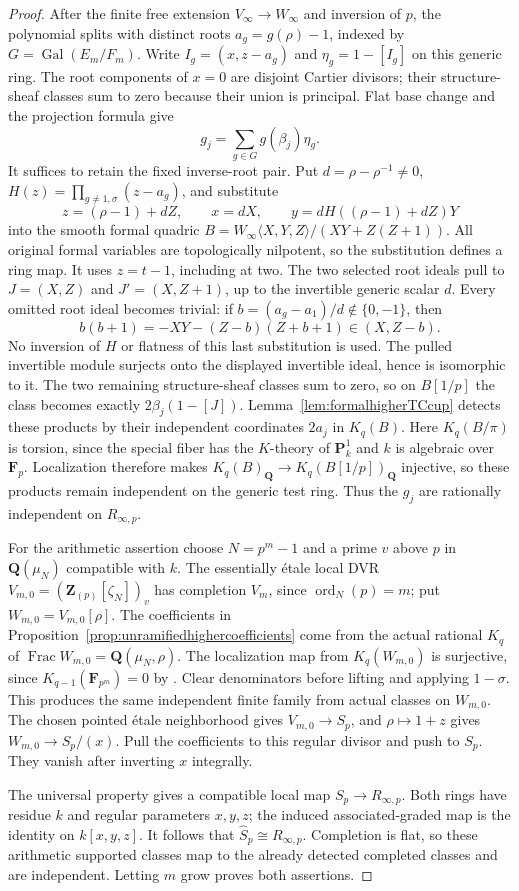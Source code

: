 \documentclass[11pt,a4paper]{article}
\theoremstyle{remark}
\newcommand{\Q}{\mathbf Q}
\newcommand{\Z}{\mathbf Z}
\newcommand{\F}{\mathbf F}
\newcommand{\Frac}{\operatorname{Frac}}
\begin{document}
\begin{proof}
After the finite free extension $V_\infty\to W_\infty$ and
inversion of $p$, the polynomial splits with distinct roots
$a_g=g(\rho)-1$, indexed by
$G=\operatorname{Gal}(E_m/F_m)$.
Write $I_g=(x,z-a_g)$ and $\eta_g=1-[I_g]$ on this generic ring.
The root components of $x=0$ are disjoint Cartier divisors;
their structure-sheaf classes sum to zero because their union is
principal. Flat base change and the projection formula give
\[
 g_j=\sum_{g\in G}g(\beta_j)\eta_g.
\]
It suffices to retain the fixed inverse-root pair.
Put $d=\rho-\rho^{-1}\ne0$,
$H(z)=\prod_{g\ne1,\sigma}(z-a_g)$, and substitute
\[
 z=(\rho-1)+dZ,\qquad x=dX,\qquad
 y=dH((\rho-1)+dZ)Y
\]
into the smooth formal quadric
$B=W_\infty\langle X,Y,Z\rangle/(XY+Z(Z+1))$.
All original formal variables are topologically nilpotent, so the
substitution defines a ring map. It uses $z=t-1$, including at two.
The two selected root ideals pull to $J=(X,Z)$ and $J'=(X,Z+1)$,
up to the invertible generic scalar $d$.
Every omitted root ideal becomes trivial: if
$b=(a_g-a_1)/d\notin\{0,-1\}$, then
\[
 b(b+1)=-XY-(Z-b)(Z+b+1)\in(X,Z-b).
\]
No inversion of $H$ or flatness of this last substitution is used.
The pulled invertible module surjects onto the displayed invertible
ideal, hence is isomorphic to it.
The two remaining structure-sheaf classes sum to zero, so on
$B[1/p]$ the class becomes exactly
$2\beta_j(1-[J])$.
Lemma~\ref{lem:formalhigherTCcup} detects these products by their
independent coordinates $2a_j$ in $K_q(B)$.
Here $K_q(B/\pi)$ is torsion, since the special fiber has the
$K$-theory of $\mathbf P^1_k$ and $k$ is algebraic over $\F_p$.
Localization therefore makes $K_q(B)_{\Q}\to K_q(B[1/p])_{\Q}$
injective, so these products remain independent on the generic
test ring.
Thus the $g_j$ are rationally independent on $R_{\infty,p}$.

For the arithmetic assertion choose $N=p^m-1$ and a prime $v$
above $p$ in $\Q(\mu_N)$ compatible with $k$.
The essentially \'etale local DVR
$V_{m,0}=(\Z_{(p)}[\zeta_N])_v$ has completion $V_m$, since
$\operatorname{ord}_N(p)=m$; put $W_{m,0}=V_{m,0}[\rho]$.
The coefficients in Proposition~\ref{prop:unramifiedhighercoefficients}
come from the actual rational $K_q$ of
$\Frac W_{m,0}=\Q(\mu_N,\rho)$.
The localization map from $K_q(W_{m,0})$ is surjective, since
$K_{q-1}(\F_{p^m})=0$ by \cite{Quillen}.
Clear denominators before lifting and applying $1-\sigma$.
This produces the same independent finite family from actual
classes on $W_{m,0}$.
The chosen pointed \'etale neighborhood gives $V_{m,0}\to S_p$,
and $\rho\mapsto1+z$ gives
$W_{m,0}\to S_p/(x)$.
Pull the coefficients to this regular divisor and push to $S_p$.
They vanish after inverting $x$ integrally.

The universal property gives a compatible local map
$S_p\to R_{\infty,p}$.
Both rings have residue $k$ and regular parameters $x,y,z$;
the induced associated-graded map is the identity on $k[x,y,z]$.
It follows that $\widehat S_p\cong R_{\infty,p}$.
Completion is flat, so these arithmetic supported classes map to
the already detected completed classes and are independent.
Letting $m$ grow proves both assertions.
\end{proof}
\end{document}
